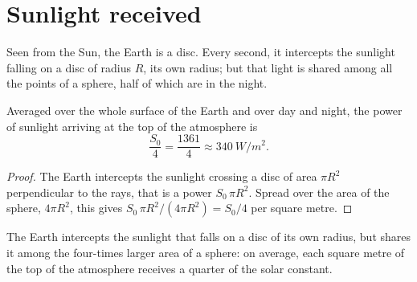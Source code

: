 \section{Sunlight received}

Seen from the Sun, the Earth is a disc. Every second, it intercepts the
sunlight falling on a disc of radius $R$, its own radius; but that light is
shared among all the points of a sphere, half of which are in the night.

\begin{proposition}\label{prop:g10:earth-energy-budget:quarter}
Averaged over the whole surface of the Earth and over day and night, the
power of sunlight arriving at the top of the atmosphere is
\[
  \frac{S_0}{4} = \frac{1361}{4} \approx \qty{340}{W/m^2}.
\]
\end{proposition}

\begin{proof}
The Earth intercepts the sunlight crossing a disc of area $\pi R^2$
perpendicular to the rays, that is a power $S_0\,\pi R^2$. Spread over the
area of the sphere, $4\pi R^2$, this gives $S_0\,\pi R^2/(4\pi R^2) =
S_0/4$ per square metre.
\end{proof}

\begin{omfigure}

{\small The Earth intercepts the sunlight that falls on a disc of its own
radius, but shares it among the four-times larger area of a sphere: on
average, each square metre of the top of the atmosphere receives a quarter of
the solar constant.}
\end{omfigure}

